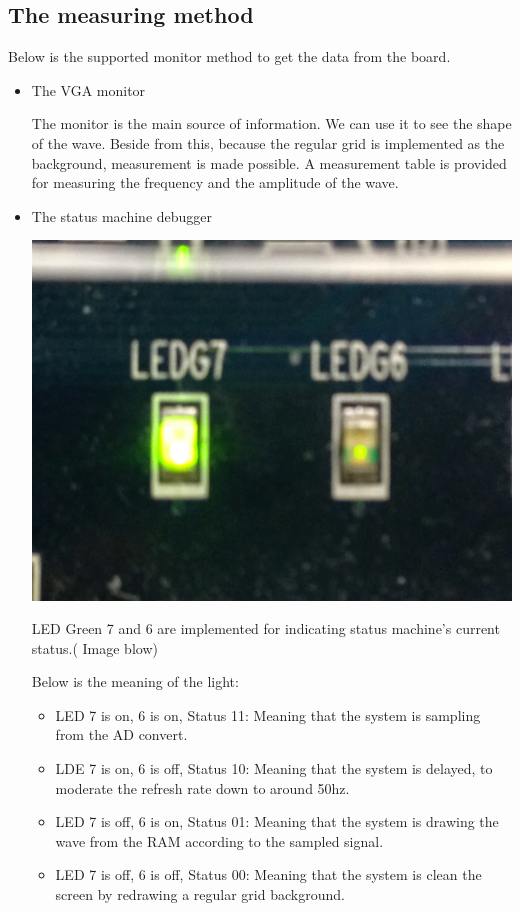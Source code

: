 \documentclass[11pt]{scrartcl}
\begin{document}
\subsection{The measuring method}
Below is the supported monitor method to get the data from the board.
\begin{itemize}
    \item The VGA monitor
    
    The monitor is the main source of information. We can use it to see the shape of the wave. Beside from this, because the regular grid is implemented as the background, measurement is made possible. A measurement table is provided for measuring the frequency and the amplitude of the wave. 
    \item The status machine debugger
    \begin{center}     
\begin{minipage}[t]{\linewidth}

{
\includegraphics[scale = 0.05]{IMG_1386.JPG}
}
\end{minipage}
\medskip
\end{center}

     LED Green 7 and 6 are implemented for indicating status machine's current status.( Image blow)

    
    Below is the meaning of the light:
    \begin{itemize}
        \item LED 7 is on, 6 is on, Status 11:
         Meaning that the system is sampling from the AD convert.
         \item LDE 7 is on, 6 is off, Status 10:
         Meaning that the system is delayed, to moderate the refresh rate down to around 50hz.
         \item LED 7 is off, 6 is on, Status 01:
         Meaning that the system is drawing the wave from the RAM according to the sampled signal.
         \item LED 7 is off, 6 is off, Status 00:
         Meaning that the system is clean the screen by redrawing a regular grid background.
         

\end{itemize}
\end{itemize}
\end{document}
